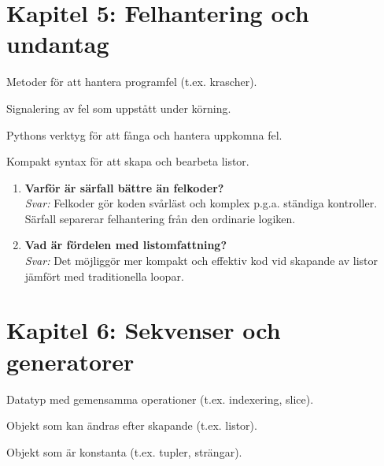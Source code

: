 \documentclass[11pt,a4paper]{article}
\begin{document}
\section{Kapitel 5: Felhantering och undantag}

\begin{description}[style=nextline, leftmargin=1cm, labelindent=0.5cm]
    \item[\color{primary}Felhantering] Metoder för att hantera programfel (t.ex. krascher).
    \item[\color{primary}Särfall (Exception)] Signalering av fel som uppstått under körning.
    \item[\color{primary}try/except] Pythons verktyg för att fånga och hantera uppkomna fel.
    \item[\color{primary}Listomfattning] Kompakt syntax för att skapa och bearbeta listor.
\end{description}

\begin{enumerate}[label=\bfseries\color{primary}Fråga \arabic*:, leftmargin=1.8cm]
    \item \textbf{Varför är särfall bättre än felkoder?}
    \\ \textit{Svar:} Felkoder gör koden svårläst och komplex p.g.a. ständiga kontroller. Särfall separerar felhantering från den ordinarie logiken.
    
    \item \textbf{Vad är fördelen med listomfattning?}
    \\ \textit{Svar:} Det möjliggör mer kompakt och effektiv kod vid skapande av listor jämfört med traditionella loopar.
\end{enumerate}

\section{Kapitel 6: Sekvenser och generatorer}

\begin{description}[style=nextline, leftmargin=1cm, labelindent=0.5cm]
    \item[\color{primary}Sekvenstyp] Datatyp med gemensamma operationer (t.ex. indexering, slice).
    \item[\color{primary}Muterbar] Objekt som kan ändras efter skapande (t.ex. listor).
    \item[\color{primary}Icke-muterbar] Objekt som är konstanta (t.ex. tupler, strängar).
\end{description}
\end{document}

